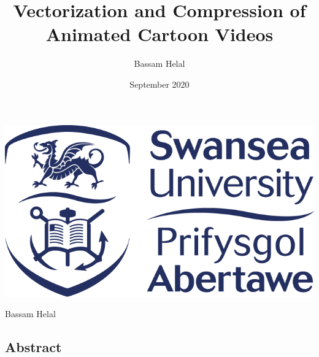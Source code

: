 \documentclass[12pt]{article}
\title{Vectorization and Compression of Animated Cartoon Videos}
\author{Bassam Helal}
\date{September 2020}
\newcommand{\black}{
\pagecolor{black}
\color{white}
}
\begin{document}
    \black


    \maketitle %

    \begin{center}
        \vspace{8cm}
        \includegraphics[scale=0.65]{SwanseaUniversityLogo.png}
    \end{center}
    \begin{center}
        \vspace{1cm}
        \large
        Bassam Helal
    \end{center}

    \pagebreak

    \begin{center}
        \section*{Abstract}
    \end{center}


    \pagebreak

    \renewcommand*\contentsname{
    \begin{center}
        Table of Contents
    \end{center}}

    \tableofcontents

    \pagebreak
\end{document}
